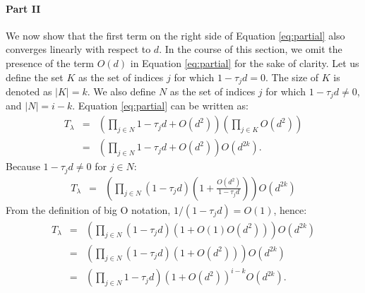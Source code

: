 \paragraph*{Part II}
We now show that the first term on the right side of Equation \eqref{eq:partial}
also converges linearly with respect to $d$. In the course of this section, we omit the presence of the term $O(d)$ in Equation \eqref{eq:partial} for the sake of clarity. Let us define the set $K$ as the set of indices $j$ for which $1-\tau_j d = 0$. The size of $K$ is denoted as $|K| = k$. We also define $N$ as the set of indices $j$ for which $1-\tau_j d \neq 0$, and $|N|=i-k$.  
%
Equation \eqref{eq:partial} can be written as:
\begin{eqnarray}
T_\lambda
& = & \left( \prod_{j \in N}1 - \tau_jd + O(d^2) \right) \left( \prod_{j \in K}O(d^2) \right) \\
& = & \left( \prod_{j \in N}1 - \tau_jd + O(d^2) \right) O(d^{2k}).
\end{eqnarray}
Because $1-\tau_j d \neq 0$ for $j \in N$:
\begin{eqnarray}
T_\lambda
& = &\left( \prod_{j \in N} (1 - \tau_jd) \left(1 + \frac{O(d^2)}{1-\tau_j d} \right) \right) O(d^{2k})
\end{eqnarray}
From the definition of big O notation, $1/(1-\tau_j d) = O(1)$, hence:
\begin{eqnarray}
T_\lambda
& = &\left( \prod_{j \in N} (1 - \tau_jd) \left(1 + O(1)O(d^2) \right) \right) O(d^{2k})\\
& = &\left( \prod_{j \in N} (1 - \tau_jd) (1 +O(d^2) ) \right) O(d^{2k})\\
& = &\left( \prod_{j \in N} 1 - \tau_jd \right) (1 + O(d^2) )^{i-k} O(d^{2k}). \label{eq:k}
\end{eqnarray}

